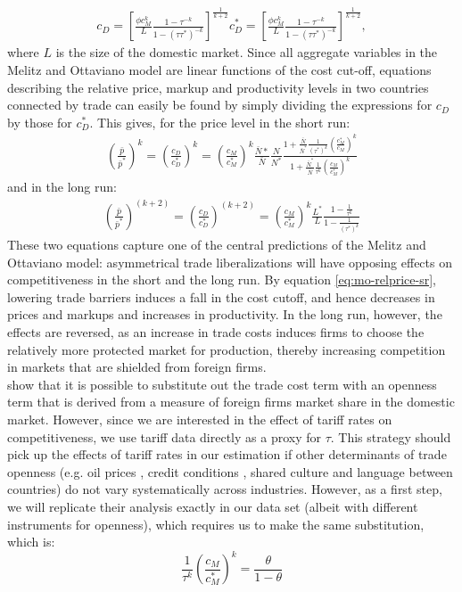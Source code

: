 \documentclass[a4paper,12pt]{article}
\begin{document}
\begin{align}
c_D = \left[ \frac{\phi c_M^k}{L} \frac{1-\tau^{-k}}{1-(\tau\tau^{*})^{-k}} \right]^{\frac{1}{k+2}}
c_D^* = \left[ \frac{\phi c_M^k}{L} \frac{1-\tau^{-k}}{1-(\tau\tau^{*})^{-k}} \right]^{\frac{1}{k+2}},
\end{align}
where $L$ is the size of the domestic market. Since all aggregate variables in the Melitz and Ottaviano model are linear functions of the cost cut-off, equations describing the relative price, markup and productivity levels in two countries connected by trade can easily be found by simply dividing the expressions for $c_D$ by those for $c_D^*$. This gives, for the price level in the short run:
\begin{align}
\left( \frac{\bar{p}}{\bar{p}^*} \right)^k = \left( \frac{c_D}{c_D^*} \right)^k = \left(\frac{c_M}{c_M^*} \right)^k \frac{\bar{N}*}{\bar{N}} \frac{N}{N^*} \frac{1 + \frac{\bar{N}}{\bar{N}^*} \frac{1}{(\tau^*)^k} \left( \frac{c_M^*}{c_M} \right)^k}{1 + \frac{\bar{N}^*}{\bar{N}} \frac{1}{\tau^k} \left( \frac{c_M}{c_M^*} \right)^k} \label{eq:mo-relprice-sr}
\end{align}
and in the long run: 
\begin{align}
\left( \frac{\bar{p}}{\bar{p}^*} \right)^(k+2) = \left( \frac{c_D}{c_D^*} \right)^(k+2) = \left( \frac{c_M}{c_M^*} \right)^k \frac{L^*}{L} \frac{1-\frac{1}{\tau^k}}{1 - \frac{1}{(\tau^*)^k}} \label{eq:mo-relprice-lr}
\end{align}
These two equations capture one of the central predictions of the Melitz and Ottaviano model: asymmetrical trade liberalizations will have opposing effects on competitiveness in the short and the long run. By equation \ref{eq:mo-relprice-sr}, lowering trade barriers induces a fall in the cost cutoff, and hence decreases in prices and markups and increases in productivity. In the long run, however, the effects are reversed, as an increase in trade costs induces firms to choose the relatively more protected market for production, thereby increasing competition in markets that are shielded from foreign firms. \\
\citet{Chen2009} show that it is possible to substitute out the trade cost term with an openness term that is derived from a measure of foreign firms market share in the domestic market. However, since we are interested in the effect of tariff rates on competitiveness, we use tariff data directly as a proxy for $\tau$. This strategy should pick up the effects of tariff rates in our estimation if other determinants of trade openness (e.g. oil prices \citep{Kilian2009}, credit conditions \citep{Chor2012}, shared culture and language between countries) do not vary systematically across industries. However, as a first step, we will replicate their analysis exactly in our data set (albeit with different instruments for openness), which requires us to make the same substitution, which is:
\begin{equation}
\frac{1}{\tau^k} \left( \frac{c_M}{c_M^*} \right)^k = \frac{\theta}{1-\theta} 
\end{equation}
\end{document}
